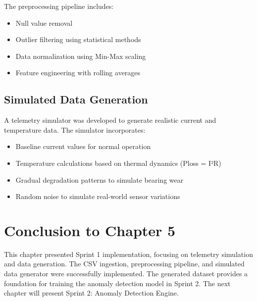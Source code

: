 The preprocessing pipeline includes:
\begin{itemize}
    \item Null value removal
    \item Outlier filtering using statistical methods
    \item Data normalization using Min-Max scaling
    \item Feature engineering with rolling averages
\end{itemize}

\subsection{Simulated Data Generation}

A telemetry simulator was developed to generate realistic current and temperature data. The simulator incorporates:
\begin{itemize}
    \item Baseline current values for normal operation
    \item Temperature calculations based on thermal dynamics (Ploss = I²R)
    \item Gradual degradation patterns to simulate bearing wear
    \item Random noise to simulate real-world sensor variations
\end{itemize}

\section*{Conclusion to Chapter 5}

This chapter presented Sprint 1 implementation, focusing on telemetry simulation and data generation. The CSV ingestion, preprocessing pipeline, and simulated data generator were successfully implemented. The generated dataset provides a foundation for training the anomaly detection model in Sprint 2. The next chapter will present Sprint 2: Anomaly Detection Engine.
